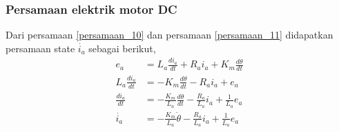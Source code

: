 \documentclass[../cover.tex]{subfiles}
\begin{document}
        \subsubsection{Persamaan elektrik motor DC}
            Dari persamaan \eqref{persamaan_10} dan persamaan \eqref{persamaan_11} didapatkan persamaan state $\dot{i_a}$ sebagai berikut,
            \begin{equation}
                \begin{split}
                    e_a &= L_a\frac{di_a}{dt} + R_a i_a + K_m\frac{d\theta}{dt} \\[5pt]
                    L_a\frac{di_a}{dt} &= -K_m\frac{d\theta}{dt} - R_a i_a + e_a \\[5pt]
                    \frac{di_a}{dt} &= -\frac{K_m}{L_a}\frac{d\theta}{dt} - \frac{R_a}{L_a}i_a + \frac{1}{L_a}e_a \\[5pt]
                    \dot{i_a} &= -\frac{K_m}{L_a}\dot{\theta} - \frac{R_a}{L_a}i_a + \frac{1}{L_a}e_a
                    \label{persamaan_12}
                \end{split}
            \end{equation}
\end{document}

